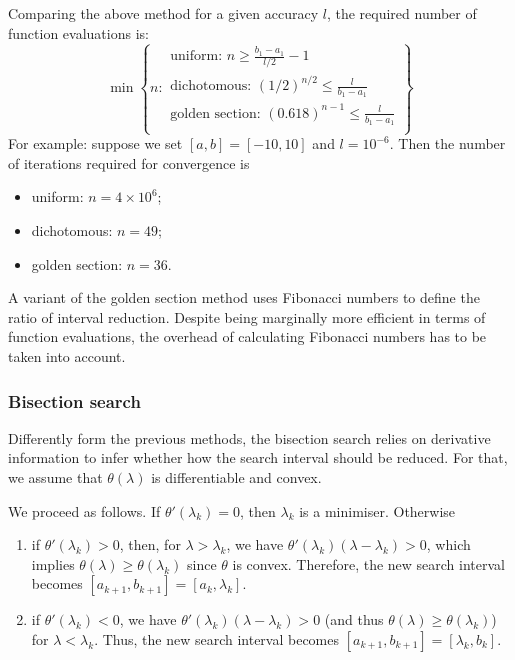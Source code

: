 Comparing the above method for a given accuracy $l$, the required number of function evaluations is:
$$\min \left\{ n : \begin{array}{l} \text{uniform: } n \geq \frac{b_1 - a_1}{l/2} - 1   \\
                               \text{dichotomous: } (1/2)^{n/2} \leq \frac{l}{b_1-a_1}  \\
                               \text{golden section: }(0.618)^{n-1} \leq \frac{l}{b_1-a_1} \\
                               \end{array} \right\}
$$
For example: suppose we set $[a,b] = [-10,10]$ and $l = 10^{-6}$. Then the number of iterations required for convergence is 
%
\begin{itemize}
\item uniform: $n=4\times 10^6$; 
\item dichotomous: $n = 49$;  
\item golden section: $n=36$.
\end{itemize}
%
A variant of the golden section method uses Fibonacci numbers to define the ratio of interval reduction. Despite being marginally more efficient in terms of function evaluations, the overhead of calculating Fibonacci numbers has to be taken into account. 
 

\subsubsection{Bisection search}

Differently form the previous methods, the bisection search relies on derivative information to infer whether how the search interval should be reduced. For that, we assume that $\theta(\lambda)$ is differentiable and convex. 

We proceed as follows. If $\theta'(\lambda_k) = 0$, then $\lambda_k$ is a minimiser. Otherwise 
\begin{enumerate}
\item if $\theta'(\lambda_k) > 0$, then, for $\lambda > \lambda_k$, we have $\theta'(\lambda_k)(\lambda - \lambda_k) > 0$, which implies $\theta(\lambda) \geq \theta(\lambda_k)$ since $\theta$ is convex. Therefore, the new search interval becomes $[a_{k+1}, b_{k+1}] = [a_k,\lambda_k]$.
\item if $\theta'(\lambda_k) < 0$, we have $\theta'(\lambda_k)(\lambda - \lambda_k) > 0$ (and thus $\theta(\lambda) \geq \theta(\lambda_k)$) for $\lambda < \lambda_k$. Thus, the new search interval becomes $[a_{k+1}, b_{k+1}] = [\lambda_k, b_k]$.
\end{enumerate}
 
